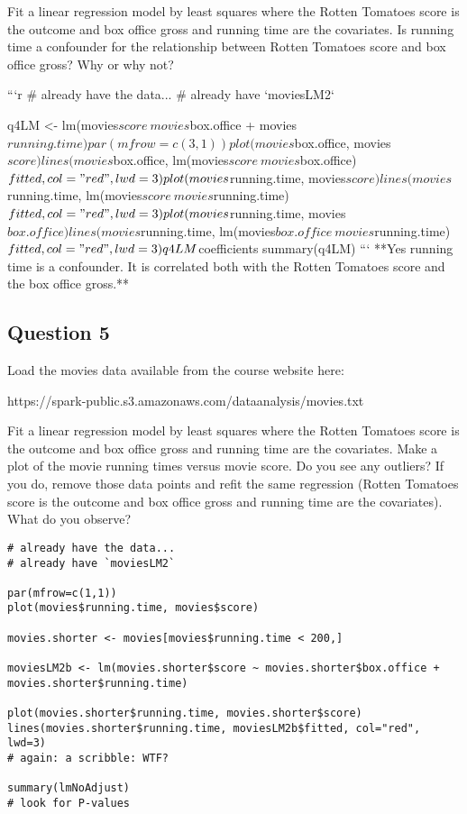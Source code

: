 \documentclass[12pt]{article}
\begin{document}
Fit a linear regression model by least squares where the Rotten Tomatoes score
is the outcome and box office gross and running time are the covariates. Is
running time a confounder for the relationship between Rotten Tomatoes score and
box office gross? Why or why not?

```{r}
# already have the data...
# already have `moviesLM2`

q4LM <- lm(movies$score ~ movies$box.office + movies$running.time)

par(mfrow=c(3,1))
plot(movies$box.office, movies$score)
lines(movies$box.office, lm(movies$score ~ movies$box.office)$fitted, col="red", lwd=3)
plot(movies$running.time, movies$score)
lines(movies$running.time, lm(movies$score ~ movies$running.time)$fitted, col="red", lwd=3)
plot(movies$running.time, movies$box.office)
lines(movies$running.time, lm(movies$box.office ~ movies$running.time)$fitted, col="red", lwd=3)

q4LM$coefficients
summary(q4LM)
```
**Yes running time is a confounder. It is correlated both with the Rotten
Tomatoes score and the box office gross.**
\newpage
\subsection*{Question 5}

Load the movies data available from the course website here: 

https://spark-public.s3.amazonaws.com/dataanalysis/movies.txt 

Fit a linear regression model by least squares where the Rotten Tomatoes score
is the outcome and box office gross and running time are the covariates. Make a
plot of the movie running times versus movie score. Do you see any outliers? If
you do, remove those data points and refit the same regression (Rotten Tomatoes
score is the outcome and box office gross and running time are the covariates).
What do you observe?

\begin{verbatim}
# already have the data...
# already have `moviesLM2`

par(mfrow=c(1,1))
plot(movies$running.time, movies$score)

movies.shorter <- movies[movies$running.time < 200,]

moviesLM2b <- lm(movies.shorter$score ~ movies.shorter$box.office + movies.shorter$running.time)

plot(movies.shorter$running.time, movies.shorter$score)
lines(movies.shorter$running.time, moviesLM2b$fitted, col="red", lwd=3)
# again: a scribble: WTF?

summary(lmNoAdjust)
# look for P-values
\end{verbatim}
\end{document}

